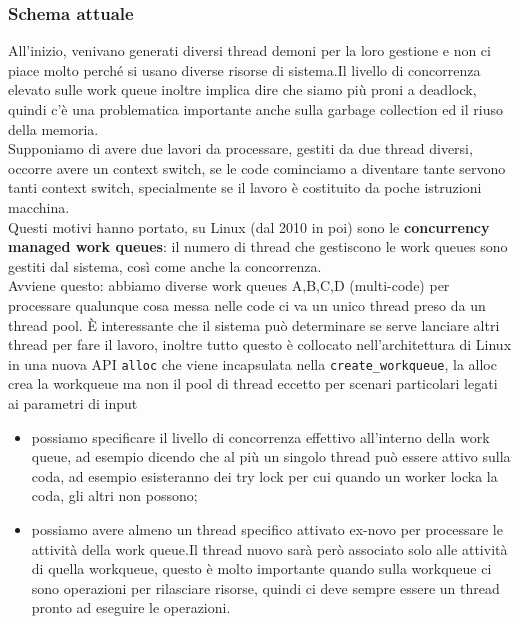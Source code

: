 \documentclass[12pt, oneside]{extbook}
\begin{document}
\subsubsection{Schema attuale}
All'inizio, venivano generati diversi thread demoni per la loro gestione e non ci piace molto perché si usano diverse risorse di sistema.Il livello di concorrenza elevato sulle work queue inoltre implica dire che siamo più proni a deadlock, quindi c'è una problematica importante anche sulla garbage collection ed il riuso della memoria.\\Supponiamo di avere due lavori da processare, gestiti da due thread diversi, occorre avere un context switch, se le code cominciamo a diventare tante servono tanti context switch, specialmente se il lavoro è costituito da poche istruzioni macchina.\\Questi motivi hanno portato, su Linux (dal 2010 in poi) sono le \textbf{concurrency managed work queues}: il numero di thread che gestiscono le work queues sono gestiti dal sistema, così come anche la concorrenza.\\Avviene questo: abbiamo diverse work queues A,B,C,D (multi-code) per processare qualunque cosa messa nelle code ci va un unico thread preso da un thread pool. È interessante che il sistema può determinare se serve lanciare altri thread per fare il lavoro, inoltre tutto questo è collocato nell'architettura di Linux in una nuova API \texttt{alloc} che viene incapsulata nella \texttt{create\_workqueue}, la alloc crea la workqueue ma non il pool di thread eccetto per scenari particolari legati ai parametri di input
\begin{itemize}
\item possiamo specificare il livello di concorrenza effettivo all'interno della work queue, ad esempio dicendo che al più un singolo thread può essere attivo sulla coda, ad esempio esisteranno dei try lock per cui quando un worker locka la coda, gli altri non possono;
\item possiamo avere almeno un thread specifico attivato ex-novo per processare le attività della work queue.Il thread nuovo sarà però associato solo alle attività di quella workqueue, questo è molto importante quando sulla workqueue ci sono operazioni per rilasciare risorse, quindi ci deve sempre essere un thread pronto ad eseguire le operazioni.
\end{itemize}
\end{document}
